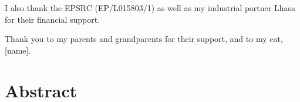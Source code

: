 \documentclass[a4paper,12pt]{report}
\begin{document}
I also thank the EPSRC (EP/L015803/1) as well as my industrial partner Lhasa for their financial support.

Thank you to my parents and grandparents for their support, and to my cat, [name].


\chapter*{Abstract}


\end{document}
